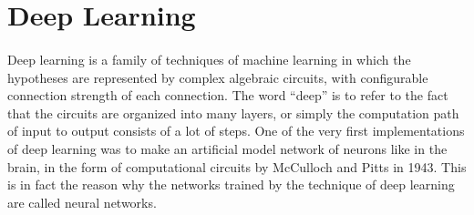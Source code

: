 \documentclass{article}
\begin{document}
















\section{Deep Learning}
  \paragraph{} Deep learning is a family of techniques of machine learning in which the hypotheses are represented by complex algebraic circuits, with configurable connection strength of each connection. The word “deep” is to refer to the fact that the circuits are organized into many layers, or simply the computation path of input to output consists of a lot of steps. One of the very first implementations of deep learning was to make an artificial model network of neurons like in the brain, in the form of computational circuits by McCulloch and Pitts in 1943. This is in fact the reason why the networks trained by the technique of deep learning are called neural networks. 
\end{document}
